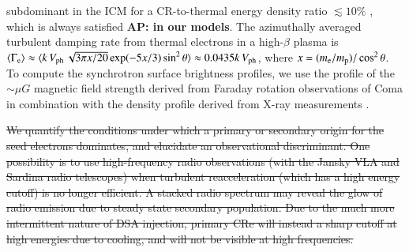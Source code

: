 \documentclass[useAMS,usenatbib]{mn2e}
\newcommand{\Vph}{V_\mathrm{ph}}
\newcommand{\mug}{\mu G}
\def\AP#1{{\bf  AP: #1}}
\begin{document}
subdominant in the ICM for a CR-to-thermal energy density ratio
$\lesssim 10 \%$ \citep{brunetti07}, which is always satisfied \AP{in our models}. The
azimuthally averaged turbulent damping rate from thermal electrons
\citep{brunetti07} in a high-$\beta$ plasma is $
\langle\Gamma_{\rmn{e}}\rangle \approx \langle k\,\Vph\,\sqrt{3\pi
  x/20}\exp(-5x/3)\sin^2{\theta}\rangle\approx 0.0435k\,\Vph$, where
$x=(m_{{\mathrm{e}}}/m_{{\mathrm{p}}})/\cos^2{\theta}$. To compute the
synchrotron surface brightness profiles, we use the profile of the
$\sim\mug$ magnetic field strength derived from Faraday rotation
observations of Coma \citep{bonafede10} in combination with the density
profile derived from X-ray measurements \citep{1992A&A...259L..31B}.

\sout{We quantify the conditions under which a primary or secondary
  origin for the seed electrons dominates, and elucidate an
  observational discriminant. One possibility is to use high-frequency
  radio observations (with the Jansky VLA and Sardina radio
  telescopes) when turbulent reacceleration (which has a high energy
  cutoff) is no longer efficient. A stacked radio spectrum may reveal
  the glow of radio emission due to steady state secondary
  population. Due to the much more intermittent nature of DSA
  injection, primary CRe will instead a sharp cutoff at high energies
  due to cooling, and will not be visible at high frequencies.}
\end{document}
